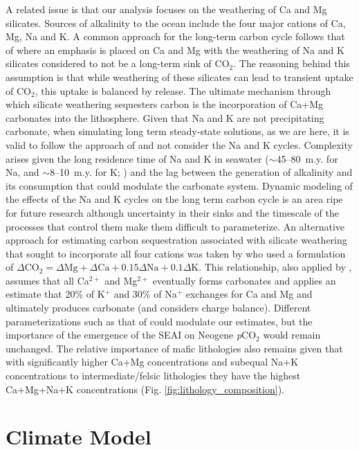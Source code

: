 \documentclass[11pt,letterpaper]{article}
\newcommand{\pCOtwo}{\textit{p}CO$_{2}$\xspace}
\newcommand{\COtwo}{CO$_{2}$\xspace}
\begin{document}
A related issue is that our analysis focuses on the weathering of Ca and Mg silicates. Sources of alkalinity to the ocean include the four major cations of Ca, Mg, Na and K. A common approach for the long-term carbon cycle follows that of \citet{Berner1983a} where an emphasis is placed on Ca and Mg with the weathering of Na and K silicates considered to not be a long-term sink of \COtwo. The reasoning behind this assumption is that while weathering of these silicates can lead to transient uptake of \COtwo, this uptake is balanced by release. The ultimate mechanism through which silicate weathering sequesters carbon is the incorporation of Ca+Mg carbonates into the lithosphere. Given that Na and K are not precipitating carbonate, when simulating long term steady-state solutions, as we are here, it is valid to follow the approach of \citet{Berner1983a} and not consider the Na and K cycles. Complexity arises given the long residence time of Na and K in seawater ($\sim$45--80~m.y. for Na, and $\sim$8--10~m.y. for K; \citealp{Emerson2008a, Lecuyer2016a}) and the lag between the generation of alkalinity and its consumption that could modulate the carbonate system. Dynamic modeling of the effects of the Na and K cycles on the long term carbon cycle is an area ripe for future research although uncertainty in their sinks and the timescale of the processes that control them make them difficult to parameterize. An alternative approach for estimating carbon sequestration associated with silicate weathering that sought to incorporate all four cations was taken by \citet{France-Lanord1997a} who used a formulation of $\Delta \textrm{CO}_2 = \Delta \textrm{Mg} + \Delta \textrm{Ca} + 0.15 \Delta \textrm{Na} + 0.1 \Delta \textrm{K}$. This relationship, also applied by \citet{Schopka2011a}, assumes that all Ca$^{2+}$ and Mg$^{2+}$ eventually forms carbonates and applies an estimate that 20\% of K$^{+}$ and 30\% of Na$^{+}$ exchanges for Ca and Mg and ultimately produces carbonate (and considers charge balance). Different parameterizations such as that of \citet{France-Lanord1997a} could modulate our estimates, but the importance of the emergence of the SEAI on Neogene \pCOtwo would remain unchanged. The relative importance of mafic lithologies also remains given that with significantly higher Ca+Mg concentrations and subequal Na+K concentrations to intermediate/felsic lithologies they have the highest Ca+Mg+Na+K concentrations (Fig. \ref{fig:lithology_composition}).

\section*{Climate Model}
\end{document}
